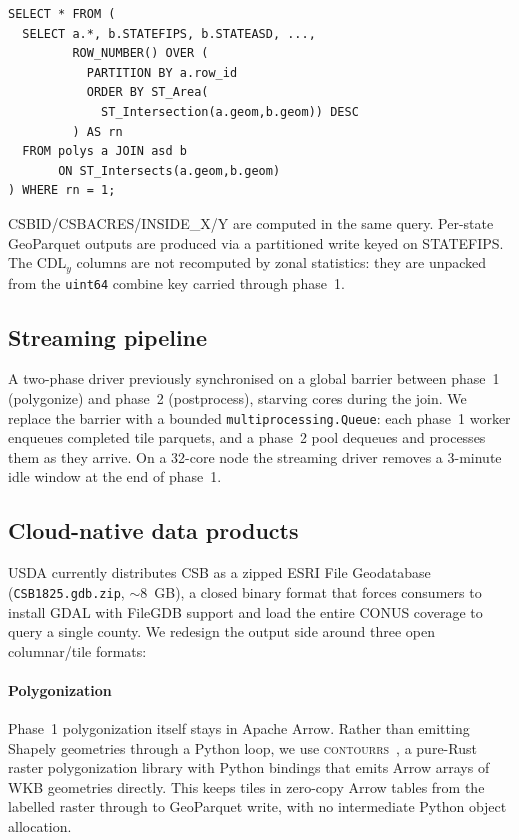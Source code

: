 \documentclass[preprint,12pt]{elsarticle}
\begin{document}
\begin{verbatim}
SELECT * FROM (
  SELECT a.*, b.STATEFIPS, b.STATEASD, ...,
         ROW_NUMBER() OVER (
           PARTITION BY a.row_id
           ORDER BY ST_Area(
             ST_Intersection(a.geom,b.geom)) DESC
         ) AS rn
  FROM polys a JOIN asd b
       ON ST_Intersects(a.geom,b.geom)
) WHERE rn = 1;
\end{verbatim}

CSBID/CSBACRES/INSIDE\_X/Y are computed in the same query. Per-state
GeoParquet outputs are produced via a partitioned write keyed on
STATEFIPS. The CDL$_y$ columns are not recomputed by zonal statistics:
they are unpacked from the \texttt{uint64} combine key carried through
phase~1.

\subsection{Streaming pipeline}
\label{sec:method-streaming}

A two-phase driver previously synchronised on a global barrier between
phase~1 (polygonize) and phase~2 (postprocess), starving cores during
the join. We replace the barrier with a bounded
\texttt{multiprocessing.Queue}: each phase~1 worker enqueues completed
tile parquets, and a phase~2 pool dequeues and processes them as they
arrive. On a 32-core node the streaming driver removes a 3-minute idle
window at the end of phase~1.

\subsection{Cloud-native data products}
\label{sec:method-cloud}

USDA currently distributes CSB as a zipped ESRI File Geodatabase
(\texttt{CSB1825.gdb.zip}, $\sim$8~GB), a closed binary format that
forces consumers to install GDAL with FileGDB support and load the
entire CONUS coverage to query a single county. We redesign the output
side around three open columnar/tile formats:

\paragraph{Polygonization} Phase~1 polygonization itself stays in
Apache Arrow. Rather than emitting Shapely geometries through a Python
loop, we use \textsc{contourrs}~\cite{contourrs}, a pure-Rust raster
polygonization library with Python bindings that emits Arrow arrays of
WKB geometries directly. This keeps tiles in zero-copy Arrow tables
from the labelled raster through to GeoParquet write, with no
intermediate Python object allocation.
\end{document}
